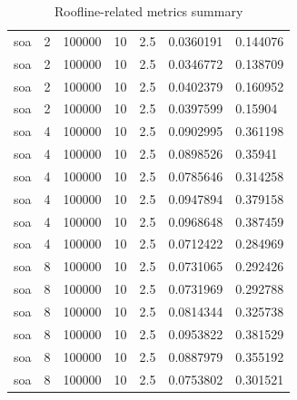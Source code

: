 \begin{table}[ht]
\begin{tabular}{lllllll}
soa & 2 & 100000 & 10 & 2.5 & 0.0360191 & 0.144076 \\ 
soa & 2 & 100000 & 10 & 2.5 & 0.0346772 & 0.138709 \\ 
soa & 2 & 100000 & 10 & 2.5 & 0.0402379 & 0.160952 \\ 
soa & 2 & 100000 & 10 & 2.5 & 0.0397599 & 0.15904 \\ 
soa & 4 & 100000 & 10 & 2.5 & 0.0902995 & 0.361198 \\ 
soa & 4 & 100000 & 10 & 2.5 & 0.0898526 & 0.35941 \\ 
soa & 4 & 100000 & 10 & 2.5 & 0.0785646 & 0.314258 \\ 
soa & 4 & 100000 & 10 & 2.5 & 0.0947894 & 0.379158 \\ 
soa & 4 & 100000 & 10 & 2.5 & 0.0968648 & 0.387459 \\ 
soa & 4 & 100000 & 10 & 2.5 & 0.0712422 & 0.284969 \\ 
soa & 8 & 100000 & 10 & 2.5 & 0.0731065 & 0.292426 \\ 
soa & 8 & 100000 & 10 & 2.5 & 0.0731969 & 0.292788 \\ 
soa & 8 & 100000 & 10 & 2.5 & 0.0814344 & 0.325738 \\ 
soa & 8 & 100000 & 10 & 2.5 & 0.0953822 & 0.381529 \\ 
soa & 8 & 100000 & 10 & 2.5 & 0.0887979 & 0.355192 \\ 
soa & 8 & 100000 & 10 & 2.5 & 0.0753802 & 0.301521 \\ 
\hline
\end{tabular}
\caption{Roofline-related metrics summary}
\label{tab:roofline_summary}
\end{table}
